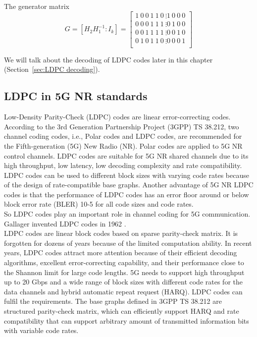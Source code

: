 The generator matrix
\[G = [H_2 H_{1}^{-1} : I_k ] =\left[\begin{matrix}1\ 0\ 0\ 1\ 1\ 0\ \vdots1\ 0\ 0\ 0\\0\ 0\ 0\ 1\ 1\ 1\ \vdots0\ 1\ 0\ 0\\0\ 0\ 1\ 1\ 1\ 1\ \vdots0\ 0\ 1\ 0\\0\ 1\ 0\ 1\ 1\ 0\ \vdots0\ 0\ 0\ 1\\\end{matrix}\right] \]

We will talk about the decoding of LDPC codes later in this chapter (Section~\ref{sec:LDPC decoding}).

\subsection{LDPC in 5G NR standards} 
Low-Density Parity-Check (LDPC) codes are linear error-correcting codes. According to the 3rd Generation Partnership Project (3GPP) TS 38.212, two channel coding codes, i.e., Polar codes and LDPC codes, are recommended for the Fifth-generation (5G) New Radio (NR). Polar codes are applied to 5G NR control channels. LDPC codes are suitable for 5G NR shared channels due to its high throughput, low latency, low decoding complexity and rate compatibility. \\
LDPC codes can be used to different block sizes with varying code rates because of the design of rate-compatible base graphs. Another advantage of 5G NR LDPC codes is that the performance of LDPC codes has an error floor around or below block error rate (BLER) 10-5 for all code sizes and code rates. \\
So LDPC codes play an important role in channel coding for 5G communication. Gallager invented LDPC codes in 1962 . \\
LDPC codes are linear block codes based on sparse parity-check matrix. It is forgotten for dozens of years because of the limited computation ability. In recent years, LDPC codes attract more attention because of their efficient decoding algorithms, excellent error-correcting capability, and their performance close to the Shannon limit for large code lengths. 5G needs to support high throughput up to 20 Gbps and a wide range of block sizes with different code rates for the data channels and hybrid automatic repeat request (HARQ). LDPC codes can fulfil the requirements. The base graphs defined in 3GPP TS 38.212 are structured parity-check matrix, which can efficiently support HARQ and rate compatibility that can support arbitrary amount of transmitted information bits with variable code rates. \\

